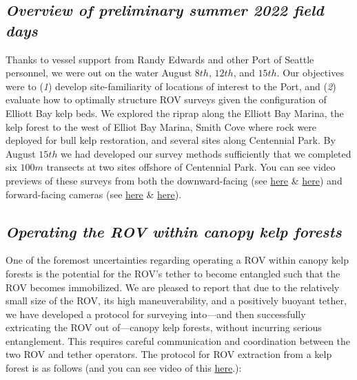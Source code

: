 \documentclass[11pt]{article}
\begin{document}
\subsection{\textit{Overview of preliminary summer 2022 field days}}
Thanks to vessel support from Randy Edwards and other Port of Seattle personnel, we were out on the water August $8th$, $12th$, and $15th$. 
Our objectives were to 
(\textit{1}) develop site-familiarity of locations of interest to the 
Port, and
(\textit{2}) evaluate how to optimally structure ROV surveys given the configuration of Elliott Bay kelp beds.
We explored the riprap along the Elliott Bay Marina, the kelp forest to 
the west of Elliot Bay Marina, Smith Cove where rock were deployed for 
bull kelp restoration, and several sites along Centennial Park.
By August $15th$ we had developed our survey methods sufficiently that 
we completed six $100m$ transects at two sites offshore of Centennial Park. 
You can see video previews of these surveys from both the 
downward-facing (see 
\href{https://drive.google.com/file/d/1BKpNbOoVZD69AsEt5G7JsOrkMyZvgtjx/view?usp=sharing}{here}
 \& 
\href{https://drive.google.com/file/d/1J8xVqzrCSNAGh-g5ZEFoMboQgHW_H4rA/view?usp=sharing}{here})
 and forward-facing cameras (see 
 \href{https://drive.google.com/file/d/1RK28xmY8yo-FMqfbQtPPxmdujq9r2AEu/view?usp=sharing}{here}
 \& 
\href{https://drive.google.com/file/d/1OGcqmQaU9CvSFK4At0ju36zfMBRCUGUl/view?usp=sharing}{here}).

\subsection{\textit{Operating the ROV within canopy kelp forests}}
One of the foremost uncertainties regarding operating a ROV within 
canopy kelp forests is the potential for the ROV's tether to become 
entangled such that the ROV becomes immobilized.  
We are pleased to report that due to the relatively small size of the 
ROV, its high maneuverability, and a positively buoyant tether, we have 
developed a protocol for surveying into---and then successfully 
extricating the ROV out of---canopy kelp forests, without incurring serious entanglement.
This requires careful communication and coordination between the two ROV and tether operators. 
The protocol for ROV extraction from a kelp forest is as follows (and 
you can see video of this 
\href{https://drive.google.com/file/d/1qdtdPwB8RHkjL27RRzu95MTenNgszDAC/view?usp=sharing}{here}.):
\end{document}
